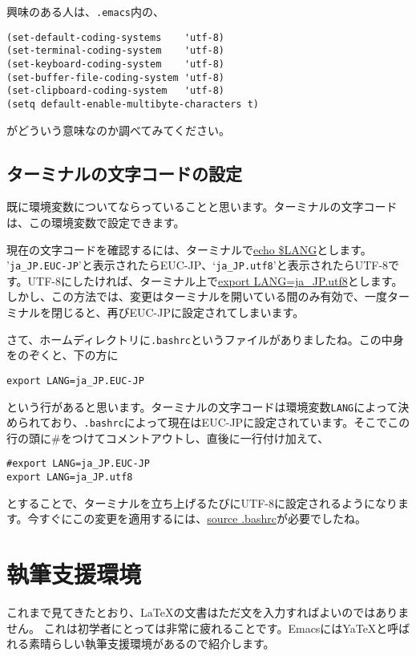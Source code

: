 興味のある人は、\verb+.emacs+内の、
\begin{screen}
\begin{verbatim}
(set-default-coding-systems    'utf-8)
(set-terminal-coding-system    'utf-8)
(set-keyboard-coding-system    'utf-8)
(set-buffer-file-coding-system 'utf-8)
(set-clipboard-coding-system   'utf-8)
(setq default-enable-multibyte-characters t)
\end{verbatim}
\end{screen}
がどういう意味なのか調べてみてください。

\subsection{ターミナルの文字コードの設定}
既に環境変数についてならっていることと思います。ターミナルの文字コードは、この環境変数で設定できます。

現在の文字コードを確認するには、ターミナルで\underline{echo \$LANG}とします。
'\verb+ja_JP.EUC-JP+'と表示されたらEUC-JP、`\verb+ja_JP.utf8+'と表示されたらUTF-8です。UTF-8にしたければ、ターミナル上で\underline{export LANG=ja\_JP.utf8}とします。しかし、この方法では、変更はターミナルを開いている間のみ有効で、一度ターミナルを閉じると、再びEUC-JPに設定されてしまいます。

さて、ホームディレクトリに\verb+.bashrc+というファイルがありましたね。この中身をのぞくと、下の方に
\begin{screen}
\begin{verbatim}
export LANG=ja_JP.EUC-JP
\end{verbatim}
\end{screen}
という行があると思います。ターミナルの文字コードは環境変数\verb+LANG+によって決められており、\verb+.bashrc+によって現在はEUC-JPに設定されています。そこでこの行の頭に\#をつけてコメントアウトし、直後に一行付け加えて、
\begin{screen}
\begin{verbatim}
#export LANG=ja_JP.EUC-JP
export LANG=ja_JP.utf8
\end{verbatim}
\end{screen}
とすることで、ターミナルを立ち上げるたびにUTF-8に設定されるようになります。今すぐにこの変更を適用するには、\underline{source .bashrc}が必要でしたね。

\pagebreak


\section{執筆支援環境}
これまで見てきたとおり、{\LaTeX}の文書はただ文を入力すればよいのではありません。
これは初学者にとっては非常に疲れることです。EmacsにはYaTeXと呼ばれる素晴らしい執筆支援環境があるので紹介します。

